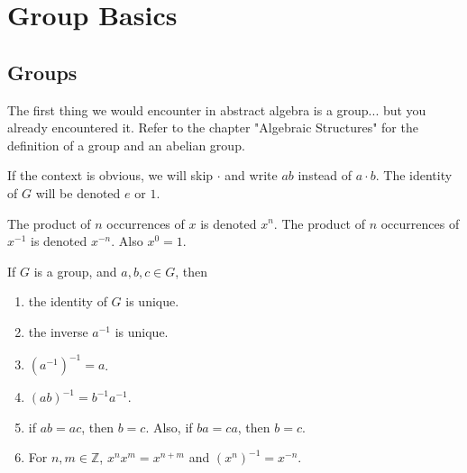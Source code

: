 

    \section{Group Basics}
    
    \subsection{Groups}
    
    The first thing we would encounter in abstract algebra is a group... but you already encountered it. Refer to the chapter "Algebraic Structures" for the definition of a group and an abelian group.
    
    If the context is obvious, we will skip $\cdot$ and write $ab$ instead of $a \cdot b$. The identity of $G$ will be denoted $e$ or $1$.
    
    \begin{defn} \label{def_group_power}
        The product of $n$ occurrences of $x$ is denoted $x^n$. The product of $n$ occurrences of $x^{-1}$ is denoted $x^{-n}$. Also $x^0 = 1$.
    \end{defn}
    
    \begin{thm} \label{thm_group_basics}
        If $G$ is a group, and $a,b,c \in G$, then \begin{enumerate}
            \item the identity of $G$ is unique.
            \item the inverse $a^{-1}$ is unique.
            \item $(a^{-1})^{-1}=a$.
            \item $(ab)^{-1} = b^{-1}a^{-1}$.
            \item if $ab=ac$, then $b=c$. Also, if $ba=ca$, then $b=c$.
            \item For $n,m \in \mathbb{Z}$, $x^nx^m = x^{n+m}$ and $(x^n)^{-1} = x^{-n}.$
        \end{enumerate}
    \end{thm}
    
